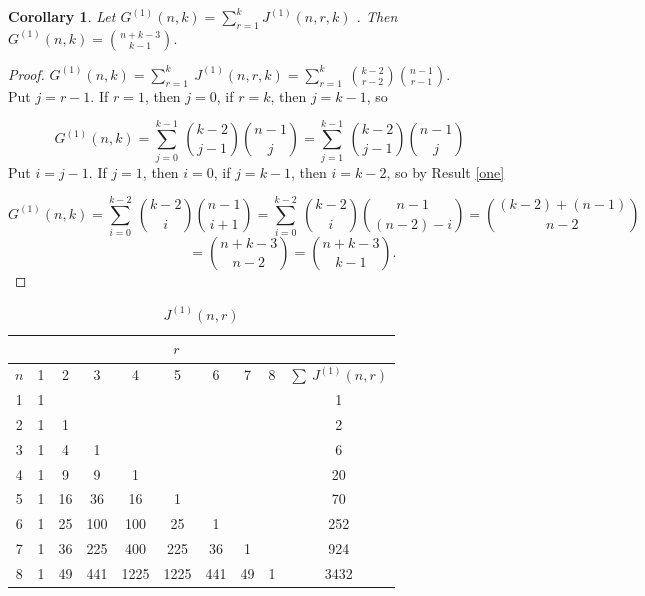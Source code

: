 \documentclass[10pt]{extarticle}
\numberwithin{equation}{section}
\numberwithin{bbb}{section}
\newtheorem{corollary}{Corollary}[section]
\numberwithin{equation}{section}
\begin{document}
\vspace{0.5cm}
\begin{corollary}
    Let $G^{(1)}(n,k)=\sum_{r=1}^{k}J^{(1)}(n,r,k)$ . Then $G^{(1)}(n,k)=\binom{n+k-3}{k-1}.$
\end{corollary}
\begin{proof}
$G^{(1)}(n,k)=\sum_{r=1}^{k} \ J^{(1)}(n,r,k)=\sum_{r=1}^{k} \ \binom{k-2}{r-2}\binom{n-1}{r-1}.$\\[10pt]
Put $j=r-1$. If $r=1$, then $j=0$, if $r=k$, then $j=k-1$, so

$$G^{(1)}(n,k)=\sum_{j=0}^{k-1} \ \binom{k-2}{j-1}\binom{n-1}{j}
=\sum_{j=1}^{k-1} \ \binom{k-2}{j-1}\binom{n-1}{j}$$
Put $i=j-1$. If $j=1$, then $i=0$, if $j=k-1$, then $i=k-2$, so by Result \ref{one}

$$G^{(1)}(n,k)=\sum_{i=0}^{k-2} \ \binom{k-2}{i}\binom{n-1}{i+1}
=\sum_{i=0}^{k-2} \ \binom{k-2}{i}\binom{n-1}{(n-2)-i}=\binom{(k-2)+(n-1)}{n-2}$$
$$\ \ \ \ \ \ \ \ \ \ \ \ \ \ \ \ \ \ \ \ \ =\binom{n+k-3}{n-2}=\binom{n+k-3}{k-1}.$$
\end{proof}

\begin{table}[h!]
    \centering
     \caption{$J^{(1)}(n,r)$}
    \renewcommand{\arraystretch}{1.2}
    \begin{tabular}{|c|c|c|c|c|c|c|c|c|c|}
    \hline
    & \multicolumn{8}{c}{$ \ \ \ \  \ \ \ \ \ \ \ \ \ r$} & \\
    \hline
    $n$ & 1 & 2 & 3 & 4 & 5 & 6 & 7 & 8 & $\sum \ J^{(1)}(n,r)$\\
    \hline
         1 & 1 & & & & & & & & 1 \\
         \hline
         2 & 1 & 1 & & & & & & & 2 \\
         \hline
         3 & 1 & 4 & 1 & & & & & & 6 \\
         \hline
         4 & 1 & 9 & 9 & 1 & & & & & 20 \\
         \hline
         5 & 1 & 16 & 36 & 16 & 1 & & & & 70 \\
         \hline
         6 & 1 & 25 & 100 & 100 & 25 & 1 & & & 252 \\
         \hline
         7 & 1 & 36 & 225 & 400 & 225 & 36 & 1 & & 924 \\
         \hline
         8 & 1 & 49 & 441 & 1225 & 1225 & 441 & 49 & 1 & 3432 \\
         \hline
    \end{tabular}
    \label{tab:placeholder}\\
\end{table}
\end{document}
